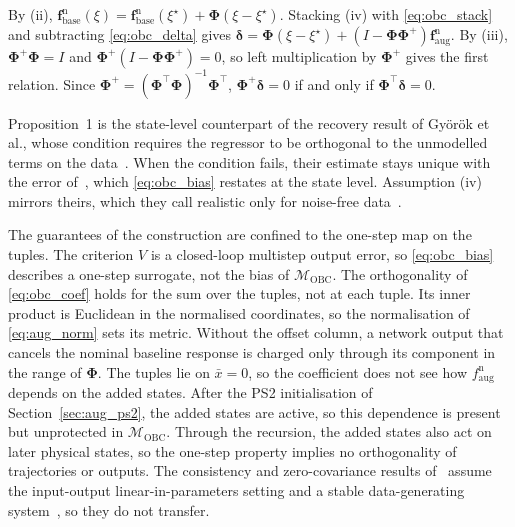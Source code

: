 \begin{IEEEproof}
By (ii), $\boldsymbol f^{\mathrm n}_{\mathrm{base}}(\xi)
=\boldsymbol f^{\mathrm n}_{\mathrm{base}}(\xi^\star)
+\boldsymbol\Phi(\xi-\xi^\star)$.
Stacking (iv) with \eqref{eq:obc_stack} and subtracting
\eqref{eq:obc_delta} gives
$\boldsymbol\delta=\boldsymbol\Phi(\xi-\xi^\star)
+(I-\boldsymbol\Phi\boldsymbol\Phi^{+})\boldsymbol f^{\mathrm n}_{\mathrm{aug}}$.
By (iii), $\boldsymbol\Phi^{+}\boldsymbol\Phi=I$ and
$\boldsymbol\Phi^{+}(I-\boldsymbol\Phi\boldsymbol\Phi^{+})=0$, so
left multiplication by $\boldsymbol\Phi^{+}$ gives the first relation.
Since $\boldsymbol\Phi^{+}=(\boldsymbol\Phi^\top\boldsymbol\Phi)^{-1}
\boldsymbol\Phi^\top$, $\boldsymbol\Phi^{+}\boldsymbol\delta=0$ if and only
if $\boldsymbol\Phi^\top\boldsymbol\delta=0$.
\end{IEEEproof}

Proposition~1 is the state-level counterpart of the recovery result of
Gy\"or\"ok et al., whose condition requires the regressor to be orthogonal to
the unmodelled terms on the data~\cite[Cond.~4, Thm.~7]{gyorok2026obc}.
When the condition fails, their estimate stays unique with the error
of~\cite[Eq.~(21)]{gyorok2026obc}, which \eqref{eq:obc_bias} restates at the
state level.
Assumption (iv) mirrors theirs, which they call realistic only for noise-free
data~\cite[Assumption~6]{gyorok2026obc}.

The guarantees of the construction are confined to the one-step map on the
tuples.
The criterion $V$ is a closed-loop multistep output error, so
\eqref{eq:obc_bias} describes a one-step surrogate, not the bias of
$\mathcal M_{\mathrm{OBC}}$.
The orthogonality of \eqref{eq:obc_coef} holds for the sum over the tuples,
not at each tuple.
Its inner product is Euclidean in the normalised coordinates, so the
normalisation of \eqref{eq:aug_norm} sets its metric.
Without the offset column, a network output that cancels the nominal baseline
response is charged only through its component in the range of
$\boldsymbol\Phi$.
The tuples lie on $\bar x=0$, so the coefficient does not see how
$f^{\mathrm n}_{\mathrm{aug}}$ depends on the added states.
After the PS2 initialisation of Section~\ref{sec:aug_ps2}, the added states
are active, so this dependence is present but unprotected in
$\mathcal M_{\mathrm{OBC}}$.
Through the recursion, the added states also act on later physical states, so
the one-step property implies no orthogonality of trajectories or outputs.
The consistency and zero-covariance results
of~\cite[Thms.~16, 18]{gyorok2026obc} assume the input-output
linear-in-parameters setting and a stable data-generating
system~\cite[Cond.~10]{gyorok2026obc}, so they do not transfer.


